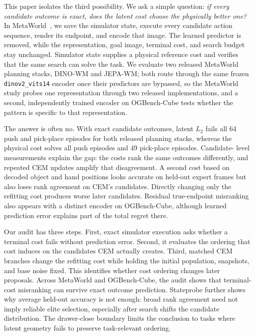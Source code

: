 \documentclass[10pt]{article}
\begin{document}
This paper isolates the third possibility. We ask a simple question: \emph{if
every candidate outcome is exact, does the latent cost choose the physically
better one?} In MetaWorld~\citep{yu2020metaworld}, we save the simulator state,
execute every candidate action sequence, render its endpoint, and encode that
image. The learned predictor is removed, while the representation, goal image,
terminal cost, and search budget stay unchanged. Simulator state supplies a
physical reference cost and verifies that the same search can solve the task.
We evaluate two released MetaWorld planning stacks, DINO-WM and JEPA-WM; both
route through the same frozen \texttt{dinov2\_vits14} encoder once their
predictors are bypassed, so the MetaWorld study probes one representation
through two released implementations, and a second, independently trained
encoder on OGBench-Cube tests whether the pattern is specific to that
representation.

The answer is often no. With exact candidate outcomes, latent $L_2$ fails all
64 push and pick-place episodes for both released planning stacks, whereas the
physical cost solves all push episodes and 49 pick-place episodes. Candidate-
level measurements explain the gap: the costs rank the same outcomes
differently, and repeated CEM updates amplify that disagreement. A second cost
based on decoded object and hand positions looks accurate on held-out expert
frames but also loses rank agreement on CEM's candidates. Directly changing
only the refitting cost produces worse later candidates. Residual true-endpoint
misranking also appears with a distinct encoder on
OGBench-Cube, although learned prediction error explains part of the total
regret there.

Our audit has three steps. First, exact simulator execution asks whether a
terminal cost fails without prediction error. Second, it evaluates the ordering
that cost induces on the candidates CEM actually creates. Third, matched CEM
branches change the refitting cost while holding the initial population,
snapshots, and base noise fixed. This identifies whether cost ordering changes
later proposals. Across MetaWorld and OGBench-Cube, the audit shows that
terminal-cost misranking can survive exact outcome prediction. Stateprobe
further shows why average held-out accuracy is not enough: broad rank agreement
need not imply reliable elite selection, especially after search shifts the
candidate distribution. The drawer-close boundary limits the conclusion to
tasks where latent geometry fails to preserve task-relevant ordering.
\end{document}
